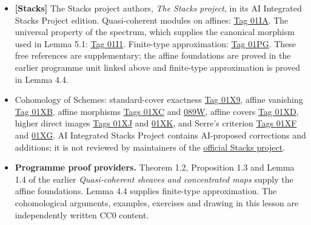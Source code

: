 \documentclass[11pt]{article}
\providecommand{\tightlist}{\setlength{\itemsep}{0pt}\setlength{\parskip}{0pt}}
\begin{document}
\begin{itemize}
\tightlist
\item
  \textbf{{[}Stacks{]}} The Stacks project authors, \emph{The Stacks
  project}, in its AI Integrated Stacks Project edition. Quasi-coherent
  modules on affines:
  \href{https://kokunoyumeto.github.io/stacks-zh-hans-cn/en/schemes.html\#schemes-lemma-quasi-coherent-affine}{Tag
  01IA}. The universal property of the spectrum, which supplies the
  canonical morphism used in Lemma 5.1:
  \href{https://kokunoyumeto.github.io/stacks-zh-hans-cn/en/schemes.html\#schemes-lemma-morphism-into-affine}{Tag
  01I1}. Finite-type approximation:
  \href{https://kokunoyumeto.github.io/stacks-zh-hans-cn/en/properties.html\#properties-lemma-quasi-coherent-colimit-finite-type}{Tag
  01PG}. These free references are supplementary; the affine foundations
  are proved in the earlier programme unit linked above and finite-type
  approximation is proved in Lemma 4.4.
\item
  Cohomology of Schemes: standard-cover exactness
  \href{https://kokunoyumeto.github.io/stacks-zh-hans-cn/en/coherent.html\#coherent-lemma-cech-cohomology-quasi-coherent-trivial}{Tag
  01X9}, affine vanishing
  \href{https://kokunoyumeto.github.io/stacks-zh-hans-cn/en/coherent.html\#coherent-lemma-quasi-coherent-affine-cohomology-zero}{Tag
  01XB}, affine morphisms
  \href{https://kokunoyumeto.github.io/stacks-zh-hans-cn/en/coherent.html\#coherent-lemma-relative-affine-vanishing}{Tags
  01XC} and
  \href{https://kokunoyumeto.github.io/stacks-zh-hans-cn/en/coherent.html\#coherent-lemma-relative-affine-cohomology}{089W},
  affine covers
  \href{https://kokunoyumeto.github.io/stacks-zh-hans-cn/en/coherent.html\#coherent-lemma-cech-cohomology-quasi-coherent}{Tag
  01XD}, higher direct images
  \href{https://kokunoyumeto.github.io/stacks-zh-hans-cn/en/coherent.html\#coherent-lemma-quasi-coherence-higher-direct-images}{Tags
  01XJ} and
  \href{https://kokunoyumeto.github.io/stacks-zh-hans-cn/en/coherent.html\#coherent-lemma-quasi-coherence-higher-direct-images-application}{01XK},
  and Serre's criterion
  \href{https://kokunoyumeto.github.io/stacks-zh-hans-cn/en/coherent.html\#coherent-lemma-quasi-compact-h1-zero-covering}{Tags
  01XF} and
  \href{https://kokunoyumeto.github.io/stacks-zh-hans-cn/en/coherent.html\#coherent-lemma-quasi-separated-h1-zero-covering}{01XG}.
  AI Integrated Stacks Project contains AI-proposed corrections and
  additions; it is not reviewed by maintainers of the
  \href{https://stacks.math.columbia.edu/}{official Stacks project}.
\item
  \textbf{Programme proof providers.} Theorem 1.2, Proposition 1.3 and
  Lemma 1.4 of the earlier \emph{Quasi-coherent sheaves and concentrated
  maps} supply the affine foundations. Lemma 4.4 supplies finite-type
  approximation. The cohomological arguments, examples, exercises and
  drawing in this lesson are independently written CC0 content.
\end{itemize}
\end{document}
